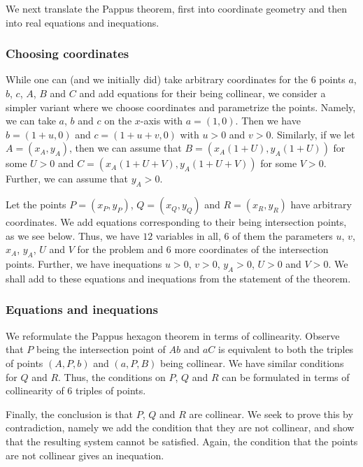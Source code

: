\documentclass{amsart}
\theoremstyle{plain}
\theoremstyle{definition}
\theoremstyle{remark}
\begin{document}
We next translate the Pappus theorem, first into coordinate geometry and then into
real equations and inequations.

\subsubsection{Choosing coordinates}

While one can (and we initially did) take arbitrary coordinates for the
\(6\) points \(a\), \(b\), \(c\), \(A\), \(B\) and \(C\) and add
equations for their being collinear, we consider a simpler variant where
we choose coordinates and parametrize the points. Namely, we can take
\(a\), \(b\) and \(c\) on the \(x\)-axis with \(a = (1, 0)\). Then we have
\(b = (1 + u, 0)\) and \(c = (1 + u + v, 0)\) with \(u>0\) and \(v>0\).
Similarly, if we let \(A = (x_A, y_A)\), then we can assume that
\(B = (x_A(1+ U), y_A(1 + U))\) for some \(U > 0\) and
\(C = (x_A(1+ U + V), y_A(1 + U + V))\) for some \(V > 0\). Further, we
can assume that \(y_A > 0\).

Let the points \(P= (x_P, y_P)\), \(Q = (x_Q, y_Q)\) and
\(R= (x_R, y_R)\) have arbitrary coordinates. We add equations
corresponding to their being intersection points, as we see below. Thus,
we have \(12\) variables in all, \(6\) of them the parameters \(u\),
\(v\), \(x_A\), \(y_A\), \(U\) and \(V\) for the problem and \(6\) more
coordinates of the intersection points. Further, we have inequations
\(u >0\), \(v >0\), \(y_A >0\), \(U > 0\) and \(V >0\). We shall add to
these equations and inequations from the statement of the theorem.

\subsubsection{Equations and inequations}

We reformulate the Pappus hexagon theorem in terms of collinearity.
Observe that \(P\) being the intersection point of \(Ab\) and \(aC\) is
equivalent to both the triples of points \((A, P, b)\) and \((a, P, B)\)
being collinear. We have similar conditions for \(Q\) and \(R\). Thus,
the conditions on \(P\), \(Q\) and \(R\) can be formulated in terms of
collinearity of \(6\) triples of points.

Finally, the conclusion is that \(P\), \(Q\) and \(R\) are collinear. We
seek to prove this by contradiction, namely we add the condition that
they are not collinear, and show that the resulting system cannot be
satisfied. Again, the condition that the points are not collinear gives
an inequation.
\end{document}
